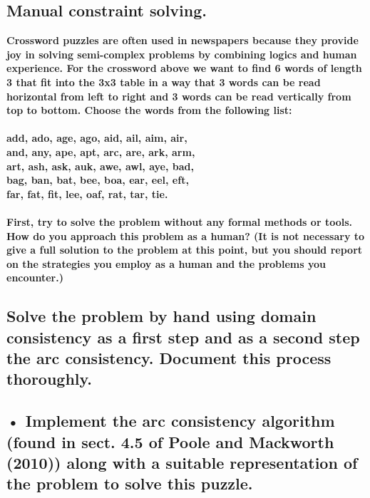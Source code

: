 \documentclass[paper=a4, fontsize=11pt]{scrartcl} %
\numberwithin{equation}{section} %
\numberwithin{figure}{section} %
\numberwithin{table}{section} %
\begin{document}
\subsection*{Manual constraint solving.}

\textbf{
Crossword puzzles are often used in newspapers because they provide joy in solving semi-complex problems by combining logics and human experience. For the crossword above we want to find 6 words of length 3 that fit into the 3x3 table in a way that 3 words can be read horizontal from left to right and 3 words can be read vertically from top to bottom. Choose the words from the following list:\\
\\
add, ado, age, ago, aid, ail, aim, air,\\
and, any, ape, apt, arc, are, ark, arm,\\
art, ash, ask, auk, awe, awl, aye, bad,\\
bag, ban, bat, bee, boa, ear, eel, eft,\\
far, fat, fit, lee, oaf, rat, tar, tie.\\
\\
First, try to solve the problem without any formal methods or tools. How do you approach this problem as a human? (It is not necessary to give a full solution to the problem at this point, but you should report on the strategies you employ as a human and the problems you encounter.)
}




\subsection*{Solve the problem by hand using domain consistency as a first step and as a second step the arc consistency. Document this process thoroughly.}



\subsection*{• Implement the arc consistency algorithm (found in sect. 4.5 of Poole and Mackworth (2010)) along with a suitable representation of the problem to solve this puzzle.}







\end{document}

